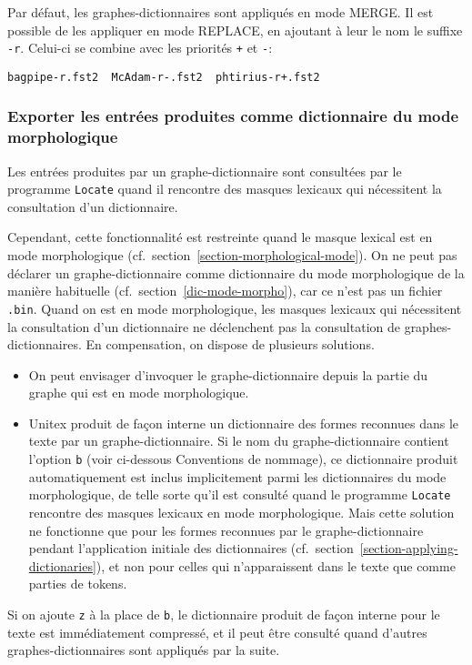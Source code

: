 \bigskip
\noindent Par défaut, les graphes-dictionnaires sont appliqués en mode MERGE. Il est possible 
de les appliquer en mode REPLACE, en ajoutant à leur le nom le suffixe \verb+-r+. Celui-ci se
combine avec les priorités \verb-+- et \verb+-+:

\bigskip
\verb?bagpipe-r.fst2  McAdam-r-.fst2  phtirius-r+.fst2?


\subsubsection{Exporter les entrées produites comme dictionnaire du mode morphologique}
Les entrées produites par un graphe-dictionnaire sont consultées
par le programme \verb+Locate+ quand il rencontre des masques lexicaux qui nécessitent la consultation
d'un dictionnaire.

\bigskip
\noindent Cependant, cette fonctionnalité est restreinte quand le masque lexical est en mode morphologique
(cf.~section~\ref{section-morphological-mode}). On ne peut pas déclarer un graphe-dictionnaire
comme dictionnaire du mode morphologique de la manière habituelle (cf.~section~\ref{dic-mode-morpho}),
car ce n'est pas un fichier \verb+.bin+. Quand on est en mode morphologique, les masques
lexicaux qui nécessitent la consultation d'un dictionnaire ne déclenchent pas la consultation
de graphes-dictionnaires. En compensation, on dispose de plusieurs solutions.
\begin{itemize}
\item On peut envisager d'invoquer le graphe-dictionnaire depuis la partie du graphe qui est en mode morphologique.
\item Unitex produit de façon interne un dictionnaire des formes reconnues dans le texte par un
graphe-dictionnaire. Si le nom du graphe-dictionnaire contient l'option \verb+b+ (voir ci-dessous
Conventions de nommage), ce dictionnaire produit automatiquement est inclus implicitement parmi
les dictionnaires du mode morphologique, de telle sorte qu'il est consulté quand le programme
 \verb+Locate+ rencontre des masques lexicaux en mode morphologique. Mais cette solution 
 ne fonctionne que pour les formes reconnues par le graphe-dictionnaire pendant l'application initiale
 des dictionnaires (cf.~section~\ref{section-applying-dictionaries}), et non pour celles qui n'apparaissent
 dans le texte que comme parties de tokens.
\end{itemize}
Si on ajoute \verb+z+ à la place de  \verb+b+, le dictionnaire produit de façon interne pour le texte est immédiatement
compressé, et il peut être consulté quand d'autres graphes-dictionnaires sont appliqués  par la suite.
 
